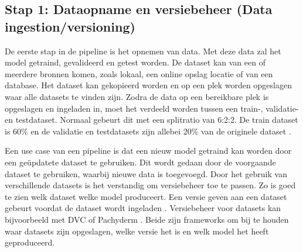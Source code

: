 \subsection{Stap 1: Dataopname en versiebeheer (Data ingestion/versioning)}\label{subsec:ch4-data-opname-en-versiebeheer}
De eerste stap in de pipeline is het opnemen van data. Met deze data zal het model getraind, gevalideerd en getest worden. De dataset kan van een of meerdere bronnen komen, zoals lokaal, een online opslag locatie of van een database. Het dataset kan gekopieerd worden en op een plek worden opgeslagen waar alle datasets te vinden zijn. Zodra de data op een bereikbare plek is opgeslagen en ingeladen in, moet het verdeeld worden tussen een train-, validatie- en testdataset. Normaal gebeurt dit met een splitratio van 6:2:2. De train dataset is 60\% en de validatie en testdatasets zijn allebei 20\% van de originele dataset \cite[p.~27-37]{building-machine-learning-pipelines-oreilly}.

Een use case van een pipeline is dat een nieuw model getraind kan worden door een geüpdatete dataset te gebruiken. Dit wordt gedaan door de voorgaande dataset te gebruiken, waarbij nieuwe data is toegevoegd. Door het gebruik van verschillende datasets is het verstandig om versiebeheer toe te passen. Zo is goed te zien welk dataset welke model produceert. Een versie geven aan een dataset gebeurt voordat de dataset wordt ingeladen \cite[p.~39-40]{building-machine-learning-pipelines-oreilly}. Versiebeheer voor datasets kan bijvoorbeeld met DVC \cite{dvc} of Pachyderm \cite{pachyderm}. Beide zijn frameworks om bij te houden waar datasets zijn opgeslagen, welke versie het is en welk model het heeft geproduceerd.



